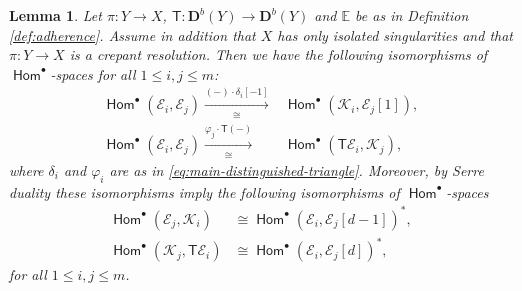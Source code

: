 \documentclass[a4paper,11pt, reqno]{amsart}
\def\E{\mathbb E}
\def\DD{\mathbf D}
\def\sE{\mathscr{E}}
\def\sK{\mathscr{K}}
\newcommand{\opname}[1]{\operatorname{\mathsf{#1}}}
\newcommand{\Hom}{\opname{Hom}}
\def\Db{\DD^b}
\newcommand{\bT}{\mathsf{T}}
\theoremstyle{plain}
\newtheorem{lemma}[dummy]{Lemma}
\theoremstyle{definition}
\numberwithin{equation}{section}
\newlength{\arrow}
\begin{document}
\begin{lemma}\label{lem:hom-computation}
    Let $\pi : Y  \to X$, $\bT : \Db(Y) \to \Db(Y) $ and $\E$ be as in Definition \ref{def:adherence}.
        Assume in addition that $X$ has only isolated singularities and that  $\pi : Y \to X$ is a crepant resolution.
        Then we have the following isomorphisms of $\Hom^\bullet$-spaces for all $1 \leq i , j \leq m$:
        \begin{align}
            \Hom^\bullet ( \sE_i , \sE_j  )  \xrightarrow[\cong]{(-)\cdot \delta_i [-1]} &\Hom^\bullet ( \sK_i , \sE_j [1] ) , \label{eq:hom-computation-iso1}\\
             \Hom^\bullet (   \sE_i    ,   \sE_j   )  \xrightarrow[\cong]{\varphi_j \cdot \bT(-)} & \Hom^\bullet ( \bT  \sE_i  , \sK_j )  ,  \label{eq:hom-computation-iso1_2}
        \end{align}
        where $\delta_i $ and $\varphi_i$ are as in \eqref{eq:main-distinguished-triangle}. 
        Moreover, by Serre duality these isomorphisms imply the following  isomorphisms of $\Hom^\bullet$-spaces
        \begin{align}
            \Hom^\bullet ( \sE_j , \sK_i ) & \cong  \Hom^\bullet ( \sE_i , \sE_j [d-1] )^\ast , \label{eq:hom-computation-iso2_2}\\
             \Hom^\bullet (  \sK_j , \bT  \sE_i  ) & \cong \Hom^\bullet (  \sE_i ,  \sE_j [d] )^\ast ,  \label{eq:hom-computation-iso2}
        \end{align}
        for all $1 \leq i , j \leq m$.
\end{lemma}
\end{document}
